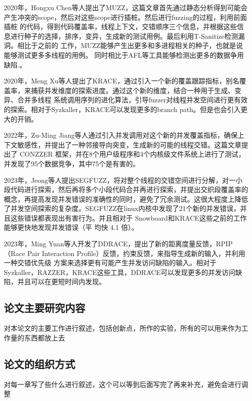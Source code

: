 2020年，Hongxu Chen\cite{chen2020muzz}等人提出了MUZZ，这篇文章首先通过静态分析得到可能会产生冲突的scope，然后对这些scope进行插桩。然后进行fuzzing的过程，利用前面插桩 的代码，得到代码覆盖率，线程上下文，交错顺序三个信息，并根据这些信息进行种子的选择，排序，变异，生成新的测试用例。最后利用T-Sanitize检测漏洞。相比于之前的 工作，MUZZ能够产生出更多和多进程相关的种子，也就是说能够测试更多多线程的用例。 同时相比于AFL等工具能够检测出更多的数据争用缺陷.。

2020年，Meng Xu\cite{xu2020krace}等人提出了KRACE，通过引入一个新的覆盖跟踪指标，别名覆盖率，来捕获并发维度的探索进度。通过这个新的维度，结合一种用于生成、变异、合并多线程 系统调用序列的进化算法，引导fuzzer对线程并发空间进行更有效的探索。相对于Syzkaller，KRACE可以发现更多的branch path。但是也会引入更大的开销。 

2022年，Zu-Ming Jiang\cite{jiang2022context}等人通过引入并发调用对这个新的并发覆盖指标，确保上 下文敏感性，并提出了一种邻接导向突变，生成新的可能的线程交错。这篇文章提出了 CONZZER 框架，并在8个用户级程序和4个内核级文件系统上进行了测试，并发现了95个数据竞争，其中75个是有害的。 

2023年，Jeong等人提出SEGFUZZ\cite{jeong2023segfuzz}，将对整个线程的交错空间进行分解，对一小段代码进行探索，然后再将多个小段代码合并再进行探索，并提出交织段覆盖率的概念，再提高发现并发错误的准确性的同时，避免了冗余测试。这很大程度上降低了并发空间探索的复杂度。SEGFUZZ在linux内核中发现了21个新的并发错误，并且这些错误都表现出有害行为。并且相对于 Snowboard和KRACE这些之前的工作能够更快地发现并发错误（平 均快 4.1 倍）。 

2023年，Ming Yuan等人开发了DDRACE\cite{yuan2023ddrace}，提出了新的距离度量反馈，RPIP（Race Pair Interaction Profile）反馈，约束反馈，来指导生成新的输入，并利用一种交错优先级 方案来选择更有可能产生并发访问缺陷的输入。相对于Syzkaller，RAZZER，KRACE这些工具，DDRACE可以发现更多的并发访问缺陷，并且可以在更短时间内发现。


\subsection{论文主要研究内容}

对本论文的主要工作进行叙述，包括创新点，所作的实验，所有的可以用来作为工作量的东西都放上去

\subsection{论文的组织方式}

对每一章写了些什么进行叙述，这个可以等到后面写完了再来补充，避免会进行调整



